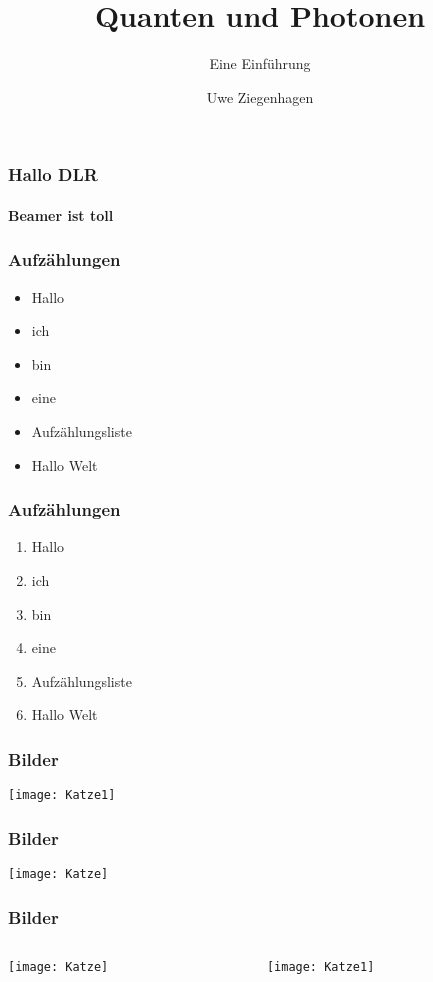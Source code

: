 \documentclass{beamer}
\title{Quanten und Photonen}
\subtitle{Eine Einführung}
\author{Uwe Ziegenhagen}
\institute{DLR}
\begin{document}
\begin{frame}
\maketitle
\end{frame}

\begin{frame}[allowframebreaks]
\frametitle{Hallo DLR}
\framesubtitle{Beamer ist toll}

\blindtext[2]

\end{frame}

\begin{frame}
\frametitle{Aufzählungen}

\begin{itemize}
\item Hallo
\item ich 
\item bin 
\item eine 
\item Aufzählungsliste
\item Hallo Welt
\end{itemize}
\end{frame}

\begin{frame}
\frametitle{Aufzählungen}

\begin{enumerate}[I]
\item Hallo
\item ich 
\item bin 
\item eine 
\item Aufzählungsliste
\item Hallo Welt
\end{enumerate}
\end{frame}

\begin{frame}
\frametitle{Bilder}

\texttt{[image: Katze1]}


\end{frame}

\begin{frame}
\frametitle{Bilder}

\texttt{[image: Katze]}

\end{frame}

\begin{frame}
\frametitle{Bilder}

\begin{columns}
\begin{column}{0.5\textwidth}
\texttt{[image: Katze]}
\end{column}
\begin{column}{0.5\textwidth}
\texttt{[image: Katze1]}
\end{column}
\end{columns}

\end{frame}
\end{document}
